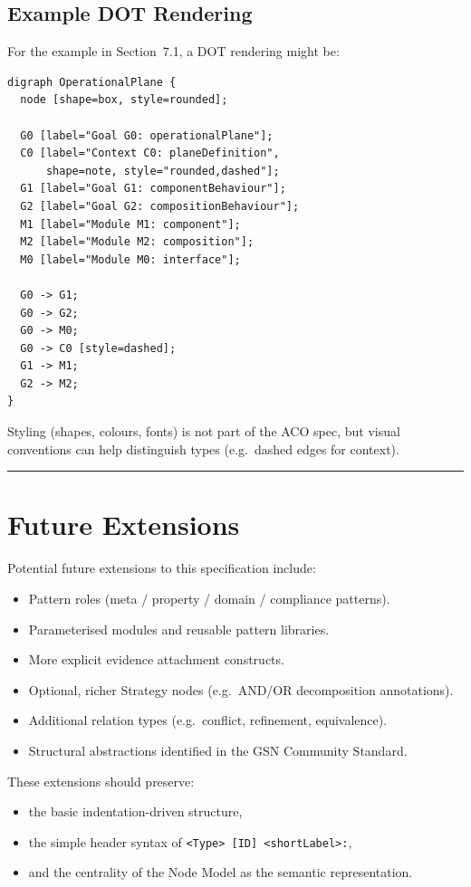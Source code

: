 \documentclass[11pt]{article}
\begin{document}
\subsection{Example DOT Rendering}

For the example in Section~7.1, a DOT rendering might be:

\begin{verbatim}
digraph OperationalPlane {
  node [shape=box, style=rounded];

  G0 [label="Goal G0: operationalPlane"];
  C0 [label="Context C0: planeDefinition",
      shape=note, style="rounded,dashed"];
  G1 [label="Goal G1: componentBehaviour"];
  G2 [label="Goal G2: compositionBehaviour"];
  M1 [label="Module M1: component"];
  M2 [label="Module M2: composition"];
  M0 [label="Module M0: interface"];

  G0 -> G1;
  G0 -> G2;
  G0 -> M0;
  G0 -> C0 [style=dashed];
  G1 -> M1;
  G2 -> M2;
}
\end{verbatim}

Styling (shapes, colours, fonts) is not part of the ACO spec, but visual conventions can help distinguish types (e.g.\ dashed edges for context).

\bigskip
\hrule
\bigskip

\section{Future Extensions}

Potential future extensions to this specification include:

\begin{itemize}[leftmargin=2em]
  \item Pattern roles (meta / property / domain / compliance patterns).
  \item Parameterised modules and reusable pattern libraries.
  \item More explicit evidence attachment constructs.
  \item Optional, richer Strategy nodes (e.g.\ AND/OR decomposition annotations).
  \item Additional relation types (e.g.\ conflict, refinement, equivalence).
  \item Structural abstractions identified in the GSN Community Standard.
\end{itemize}

These extensions should preserve:
\begin{itemize}[leftmargin=2em]
  \item the basic indentation-driven structure,
  \item the simple header syntax of \texttt{\textless Type\textgreater{} [ID] \textless shortLabel\textgreater:},
  \item and the centrality of the Node Model as the semantic representation.
\end{itemize}
\end{document}
